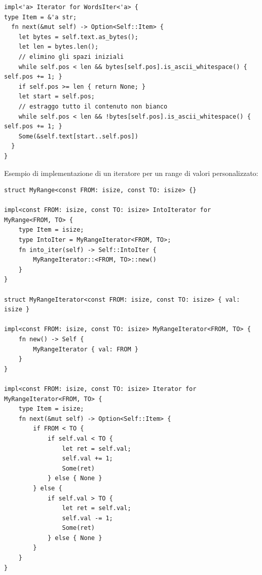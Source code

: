 \begin{verbatim}
impl<'a> Iterator for WordsIter<'a> {
type Item = &'a str;
  fn next(&mut self) -> Option<Self::Item> {
    let bytes = self.text.as_bytes();
    let len = bytes.len();
    // elimino gli spazi iniziali
    while self.pos < len && bytes[self.pos].is_ascii_whitespace() { self.pos += 1; }
    if self.pos >= len { return None; }
    let start = self.pos;
    // estraggo tutto il contenuto non bianco
    while self.pos < len && !bytes[self.pos].is_ascii_whitespace() { self.pos += 1; }
    Some(&self.text[start..self.pos])
  }
}
\end{verbatim}

Esempio di implementazione di un iteratore per un range di valori personalizzato:

\begin{verbatim}
struct MyRange<const FROM: isize, const TO: isize> {} 

impl<const FROM: isize, const TO: isize> IntoIterator for MyRange<FROM, TO> { 
    type Item = isize; 
    type IntoIter = MyRangeIterator<FROM, TO>; 
    fn into_iter(self) -> Self::IntoIter { 
        MyRangeIterator::<FROM, TO>::new() 
    } 
} 

struct MyRangeIterator<const FROM: isize, const TO: isize> { val: isize } 

impl<const FROM: isize, const TO: isize> MyRangeIterator<FROM, TO> { 
    fn new() -> Self { 
        MyRangeIterator { val: FROM } 
    } 
} 

impl<const FROM: isize, const TO: isize> Iterator for MyRangeIterator<FROM, TO> { 
    type Item = isize; 
    fn next(&mut self) -> Option<Self::Item> { 
        if FROM < TO { 
            if self.val < TO { 
                let ret = self.val; 
                self.val += 1; 
                Some(ret) 
            } else { None } 
        } else { 
            if self.val > TO { 
                let ret = self.val; 
                self.val -= 1; 
                Some(ret) 
            } else { None } 
        } 
    } 
} 
\end{verbatim}




